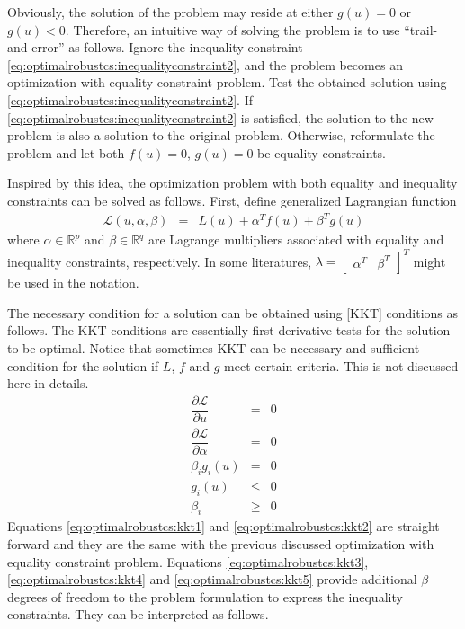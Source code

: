 Obviously, the solution of the problem may reside at either $g(u)=0$ or $g(u)<0$. Therefore, an intuitive way of solving the problem is to use ``trail-and-error'' as follows. Ignore the inequality constraint \eqref{eq:optimalrobustcs:inequalityconstraint2}, and the problem becomes an optimization with equality constraint problem. Test the obtained solution using \eqref{eq:optimalrobustcs:inequalityconstraint2}. If \eqref{eq:optimalrobustcs:inequalityconstraint2} is satisfied, the solution to the new problem is also a solution to the original problem. Otherwise, reformulate the problem and let both $f(u)=0$, $g(u)=0$ be equality constraints.

Inspired by this idea, the optimization problem with both equality and inequality constraints can be solved as follows. First, define generalized Lagrangian function
\begin{eqnarray}
  \mathcal{L}(u, \alpha, \beta) &=& L(u) + \alpha^Tf(u) + \beta^Tg(u) \nonumber
\end{eqnarray}
where $\alpha\in\mathbb{R}^p$ and $\beta\in\mathbb{R}^q$ are Lagrange multipliers associated with equality and inequality constraints, respectively. In some literatures, $\lambda = \left[\begin{array}{cc}
        \alpha^T & \beta^T
      \end{array} \right]^T$ might be used in the notation.

The necessary condition for a solution can be obtained using [KKT] conditions as follows. The KKT conditions are essentially first derivative tests for the solution to be optimal. Notice that sometimes KKT can be necessary and sufficient condition for the solution if $L$, $f$ and $g$ meet certain criteria. This is not discussed here in details.
\begin{eqnarray}
  \dfrac{\partial \mathcal{L}}{\partial u} &=& 0 \label{eq:optimalrobustcs:kkt1} \\
  \dfrac{\partial \mathcal{L}}{\partial \alpha} &=& 0 \label{eq:optimalrobustcs:kkt2} \\
  \beta_i g_i(u) &=& 0 \label{eq:optimalrobustcs:kkt3} \\
  g_i(u) &\leq& 0 \label{eq:optimalrobustcs:kkt4} \\
  \beta_i &\geq& 0 \label{eq:optimalrobustcs:kkt5}
\end{eqnarray}
Equations \eqref{eq:optimalrobustcs:kkt1} and \eqref{eq:optimalrobustcs:kkt2} are straight forward and they are the same with the previous discussed optimization with equality constraint problem. Equations \eqref{eq:optimalrobustcs:kkt3}, \eqref{eq:optimalrobustcs:kkt4} and \eqref{eq:optimalrobustcs:kkt5} provide additional $\beta$ degrees of freedom to the problem formulation to express the inequality constraints. They can be interpreted as follows.


